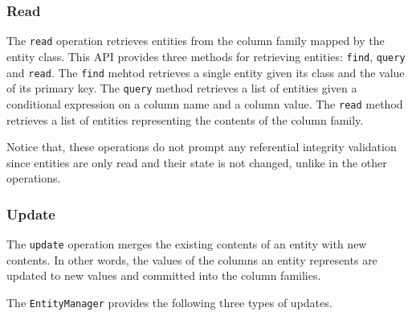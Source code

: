 		\subsubsection{Read}
		The  \texttt{read} operation retrieves  entities from the column family mapped
		by the entity class.		
		This \ac{API} provides three methods for retrieving entities: \texttt{find},
		\texttt{query} and \texttt{read}. The \texttt{find} mehtod retrieves a single
		entity given its class and the value of its primary key. The \texttt{query}
		method retrieves a list of entities given a conditional expression on a
		column  name and a column value. The \texttt{read} method retrieves a list of
		entities representing the contents of the column family.
		
		Notice that, these  operations do not prompt any referential integrity
		validation since entities are only read and their state is not changed,  unlike
		in the other operations.

		
		
		\subsubsection{Update}\label{ss:update}
		The \texttt{update} operation merges  the existing contents of an entity  with
		new contents.   In other words,  the  values of the columns an entity represents
		are updated to new values and committed into the column families.
		
		The \texttt{EntityManager} provides the following three types of updates. 
		
